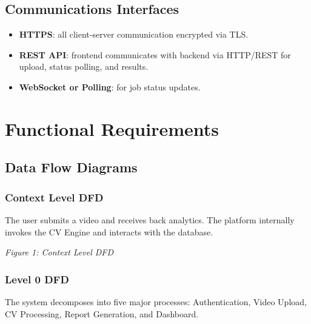 ﻿\documentclass[11pt,a4paper]{article}
\begin{document}
\subsection{Communications Interfaces}
\begin{itemize}[leftmargin=*]
    \item \textbf{HTTPS}: all client-server communication encrypted via TLS.
    \item \textbf{REST API}: frontend communicates with backend via HTTP/REST for upload, status polling, and results.
    \item \textbf{WebSocket or Polling}: for job status updates.
\end{itemize}

\section{Functional Requirements}

\subsection{Data Flow Diagrams}

\subsubsection*{Context Level DFD}
The user submits a video and receives back analytics. The platform internally invokes the CV Engine and interacts with the database.

\begin{center}

\textit{Figure 1: Context Level DFD}
\end{center}

\subsubsection*{Level 0 DFD}
The system decomposes into five major processes: Authentication, Video Upload, CV Processing, Report Generation, and Dashboard.
\end{document}
